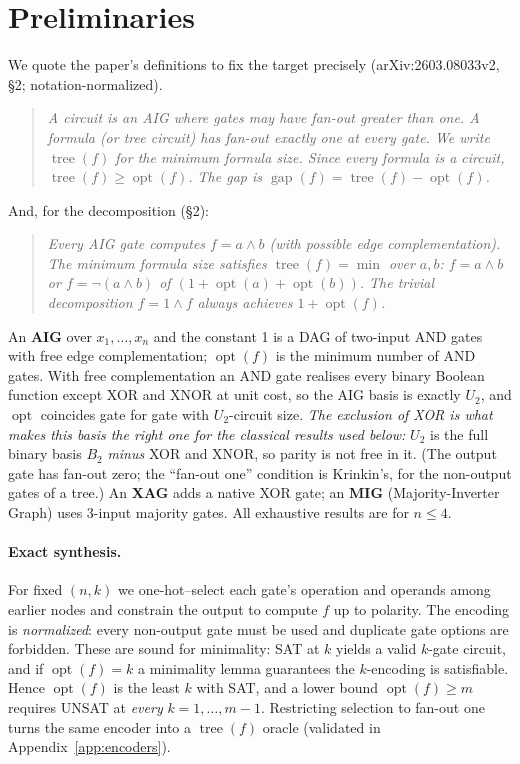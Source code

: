 \documentclass[11pt]{article}
\DeclareMathOperator{\opt}{opt}
\DeclareMathOperator{\tree}{tree}
\DeclareMathOperator{\gapop}{gap}
\theoremstyle{plain}
\begin{document}
\section{Preliminaries}
\label{sec:prelim}

We quote the paper's definitions to fix the target precisely (arXiv:2603.08033v2, \S2;
notation-normalized).

\begin{quote}
\itshape
A circuit is an AIG where gates may have fan-out greater than one. A formula (or tree circuit) has
fan-out exactly one at every gate. We write $\tree(f)$ for the minimum formula size. Since every
formula is a circuit, $\tree(f) \ge \opt(f)$. The gap is $\gapop(f) = \tree(f) - \opt(f)$.
\end{quote}

And, for the decomposition (\S2):

\begin{quote}
\itshape
Every AIG gate computes $f = a \wedge b$ (with possible edge complementation). The minimum formula
size satisfies $\tree(f) = \min$ over $a,b$: $f = a \wedge b$ or $f = \neg(a \wedge b)$ of
$(1 + \opt(a) + \opt(b))$. The trivial decomposition $f = 1 \wedge f$ always achieves $1 + \opt(f)$.
\end{quote}

An \textbf{AIG} over $x_1,\dots,x_n$ and the constant 1 is a DAG of two-input AND gates with free
edge complementation; $\opt(f)$ is the minimum number of AND gates. With free complementation an
AND gate realises every binary Boolean function except XOR and XNOR at unit cost, so the AIG basis
is exactly $U_2$, and $\opt$ coincides gate for gate with $U_2$-circuit size. \emph{The
exclusion of XOR is what makes this basis the right one for the classical results used below:}
$U_2$ is the full binary basis $B_2$ \emph{minus} XOR and XNOR, so parity is not free in it. (The output gate has
fan-out zero; the ``fan-out one'' condition is Krinkin's, for the non-output gates of a tree.) An
\textbf{XAG} adds a native XOR gate; an \textbf{MIG} (Majority-Inverter Graph) uses 3-input majority gates. All exhaustive
results are for $n \le 4$.

\paragraph{Exact synthesis.} For fixed $(n, k)$ we one-hot--select each gate's operation and
operands among earlier nodes and constrain the output to compute $f$ up to polarity. The encoding is
\emph{normalized}: every non-output gate must be used and duplicate gate options are forbidden.
These are sound for minimality: SAT at $k$ yields a valid $k$-gate circuit, and if $\opt(f) = k$ a
minimality lemma guarantees the $k$-encoding is satisfiable. Hence $\opt(f)$ is the least $k$ with
SAT, and a lower bound $\opt(f) \ge m$ requires UNSAT at \emph{every} $k = 1,\dots,m-1$. Restricting
selection to fan-out one turns the same encoder into a $\tree(f)$ oracle (validated in
Appendix~\ref{app:encoders}).
\end{document}
